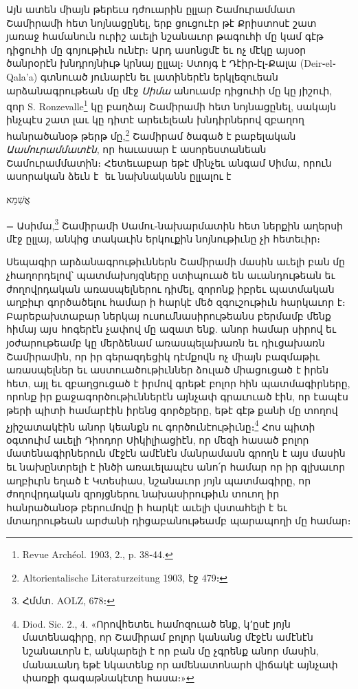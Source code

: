 \documentclass{article}
\newcommand*\svgAAAA{}
\begin{document}
{Այն ատեն միայն թերեւս դժուարին ըլլար Շամուրամմատ Շամիրամի հետ նոյնացընել, երբ ցուցուէր թէ Քրիստոսէ շատ յառաջ համանուն ուրիշ աւելի նշանաւոր թագուհի մը կամ գէթ դիցուհի մը գոյութիւն ունէր։ Արդ ասոնցմէ եւ ոչ մէկը այսօր ծանրօրէն խնդրոյնիւթ կրնայ ըլլալ։ Ստոյգ է Դէիր֊էլ֊Քալա (Deir֊el֊Qala'a) գտնուած յունարէն եւ լատիներէն երկլեզուեան արձանագրութեան մը մէջ \emph{Սիմա} անուամբ դիցուհի մը կը յիշուի, զոր S. Ronzevalle\footnote{Revue Archéol. 1903, 2., p. 38֊44.} կը բաղձայ Շամիրամի հետ նոյնացընել, սակայն ինչպէս շատ լաւ կը դիտէ արեւելեան խնդիրներով զբաղող հանրածանօթ թերթ մը,\footnote{Altorientalische Literaturzeitung 1903, էջ 479։} Շամիրամ ծագած է բաբելական \emph{Աամուրամմատէն}, որ հաւասար է ասորեստանեան Շամուրամմատին։ Հետեւաբար եթէ մինչեւ անգամ Սիմա, որուն ասորական ձեւն է $\svgAAAA$ եւ նախնականն ըլլալու է \begin{hebrewfont}אֲשִׁמַא\end{hebrewfont} = Ասիմա,\footnote{Հմմտ. AOLZ, 678։} Շամիրամի Սամու֊նախարմատին հետ ներքին աղերսի մէջ ըլլայ, անկից տակաւին երկուքին նոյնութիւնը չի հետեւիր։

Սեպագիր արձանագրութիւններն Շամիրամի մասին աւելի բան մը չհաղորդելով՝ պատմախոյզները ստիպուած են աւանդութեան եւ ժողովրդական առասպելներու դիմել, զորոնք իբրեւ պատմական աղբիւր գործածելու համար ի հարկէ մեծ զգուշութիւն հարկաւոր է։ Բարեբախտաբար ներկայ ուսումնասիրութեանս բերմամբ մենք հիմայ այս հոգերէն չափով մը ազատ ենք. անոր համար սիրով եւ յօժարութեամբ կը մերձենամ առասպելախառն եւ դիւցախառն Շամիրամին, որ իր գերազդեցիկ դէմքովն ոչ միայն բազմաթիւ առասպելներ եւ աստուածութիւններ ձուլած միացուցած է իրեն հետ, այլ եւ զբաղցուցած է իրմով գրեթէ բոլոր հին պատմագիրները, որոնք իր քաջագործութիւններէն այնչափ գրաւուած էին, որ էապէս թերի պիտի համարէին իրենց գործքերը, եթէ գէթ քանի մը տողով չյիշատակէին անոր կեանքն ու գործունէութիւնը։\footnote{Diod. Sic. 2., 4. «Որովհետեւ համոզուած ենք, կ՚ըսէ յոյն մատենագիրը, որ Շամիրամ բոլոր կանանց մէջէն ամէնէն նշանաւորն է, անկարելի է որ բան մը չգրենք անոր մասին, մանաւանդ եթէ նկատենք որ ամենատոնարհ վիճակէ այնչափ փառքի գագաթնակէտը հասա։»} Հոս պիտի օգտուիմ աւելի Դիոդոր Սիկիլիացիէն, որ մեզի հասած բոլոր մատենագիրներուն մէջէն ամէնէն մանրամասն գրողն է այս մասին եւ նախընտրելի է ինծի առաւելապէս անո՛ր համար որ իր գլխաւոր աղբիւրն եղած է Կտեսիաս, նշանաւոր յոյն պատմագիրը, որ ժողովրդական զրոյցներու նախասիրութիւն տուող իր հանրածանօթ բերումովը ի հարկէ աւելի վստահելի է եւ մտադրութեան արժանի դիցաբանութեամբ պարապողի մը համար։

}
\end{document}
